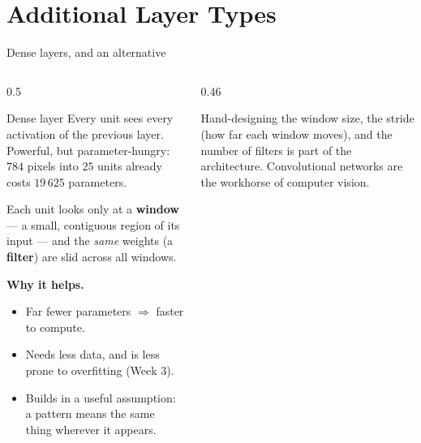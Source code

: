 \documentclass[aspectratio=169,10pt]{beamer}
\begin{document}
\section{Additional Layer Types}

\begin{frame}{Dense layers, and an alternative}
  \begin{columns}[T,onlytextwidth]
    \begin{column}{0.5\textwidth}
      \begin{block}{Dense layer}
        \footnotesize Every unit sees every activation of the previous layer. Powerful,
        but parameter-hungry: $784$ pixels into $25$ units already costs $19\,625$
        parameters.
      \end{block}
      \begin{defnbox}
        \small Each unit looks only at a \textbf{window} --- a small, contiguous region of
        its input --- and the \emph{same} weights (a \textbf{filter}) are slid across all
        windows.
      \end{defnbox}
      \footnotesize
      \textbf{Why it helps.}
      \begin{itemize}
        \item Far fewer parameters $\Rightarrow$ faster to compute.
        \item Needs less data, and is less prone to overfitting (Week 3).
        \item Builds in a useful assumption: a pattern means the same thing wherever it
              appears.
      \end{itemize}
    \end{column}
    \begin{column}{0.46\textwidth}
      \par
      \vspace{3mm}

      \footnotesize\raggedright
      Hand-designing the window size, the stride (how far each window moves), and the
      number of filters is part of the architecture. Convolutional networks are the
      workhorse of computer vision.
    \end{column}
  \end{columns}
\end{frame}
\end{document}
